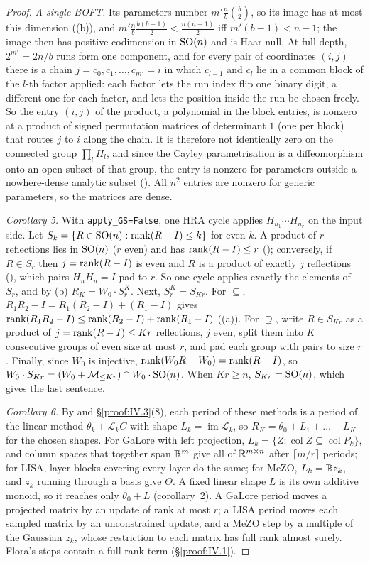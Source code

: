 \begin{proof}
\emph{A single BOFT.} Its parameters number $m'\frac nb\binom b2$, so its image has at most this dimension
((b)), and $m'\frac nb\frac{b(b-1)}2<\frac{n(n-1)}2$ iff $m'(b-1)<n-1$; the image then has positive codimension
in $\mathrm{SO}(n)$ and is Haar-null. At full depth, $2^{m'}=2n/b$ runs form one component, and for every pair of coordinates $(i,j)$
there is a chain $j=c_0,c_1,\dots,c_{m'}=i$ in which $c_{l-1}$ and $c_l$ lie in a common block of the $l$-th factor applied:
each factor lets the run index flip one binary digit, a different one for each factor, and lets the position inside the run
be chosen freely. So the entry $(i,j)$ of the product, a polynomial in the block entries, is nonzero at a product of signed
permutation matrices of determinant $1$ (one per block) that routes $j$ to $i$ along the chain. It is therefore not
identically zero on the connected group $\prod_lH_l$, and since the Cayley parametrisation is a diffeomorphism onto an open
subset of that group, the entry is nonzero for parameters outside a nowhere-dense analytic subset (). All
$n^2$ entries are nonzero for generic parameters, so the matrices are dense.

\emph{Corollary 5.} With \texttt{apply\_GS=False}, one HRA cycle applies $H_{u_1}\cdots H_{u_r}$ on the input side. Let
$S_k=\{R\in\mathrm{SO}(n):\operatorname{rank}(R-I)\le k\}$ for even $k$. A product of $r$ reflections lies in $\mathrm{SO}(n)$ ($r$ even) and has
$\operatorname{rank}(R-I)\le r$ (); conversely, if $R\in S_r$ then $j=\operatorname{rank}(R-I)$ is even and $R$ is a product of exactly $j$
reflections (), which pairs $H_uH_u=I$ pad to $r$. So one cycle applies exactly the elements of $S_r$, and by
(b) $R_K=W_0\cdot S_r^K$. Next, $S_r^K=S_{Kr}$. For $\subseteq$, $R_1R_2-I=R_1(R_2-I)+(R_1-I)$ gives
$\operatorname{rank}(R_1R_2-I)\le\operatorname{rank}(R_2-I)+\operatorname{rank}(R_1-I)$ ((a)). For $\supseteq$, write $R\in S_{Kr}$ as a product of
$j=\operatorname{rank}(R-I)\le Kr$ reflections, $j$ even, split them into $K$ consecutive groups of even size at most $r$, and pad each group
with pairs to size $r$. Finally, since $W_0$ is injective, $\operatorname{rank}(W_0R-W_0)=\operatorname{rank}(R-I)$, so
$W_0\cdot S_{Kr}=(W_0+\mathcal{M}_{\le Kr})\cap W_0\cdot\mathrm{SO}(n)$. When $Kr\ge n$, $S_{Kr}=\mathrm{SO}(n)$, which gives the last sentence.

\emph{Corollary 6.} By  and \S\ref{proof:IV.3}(8), each period of these methods is a period of
the linear method $\theta_k+\mathcal L_kC$ with shape $L_k=\operatorname{im}\mathcal L_k$, so $R_K=\theta_0+L_1+\dots+L_K$
for the chosen shapes. For GaLore with left projection, $L_k=\{Z:\operatorname{col}Z\subseteq\operatorname{col}P_k\}$, and
column spaces that together span $\mathbb{R}^m$ give all of $\mathbb{R}^{m\times n}$ after $\lceil m/r\rceil$ periods; for LISA, layer blocks
covering every layer do the same; for MeZO, $L_k=\mathbb{R} z_k$, and $z_k$ running through a basis give $\Theta$. A fixed linear
shape $L$ is its own additive monoid, so it reaches only $\theta_0+L$ (corollary~2). A GaLore period moves a projected matrix
by an update of rank at most $r$; a LISA period moves each sampled matrix by an unconstrained update, and a MeZO step by a
multiple of the Gaussian $z_k$, whose restriction to each matrix has full rank almost surely. Flora's steps contain a
full-rank term (\S\ref{proof:IV.1}).


\end{proof}
